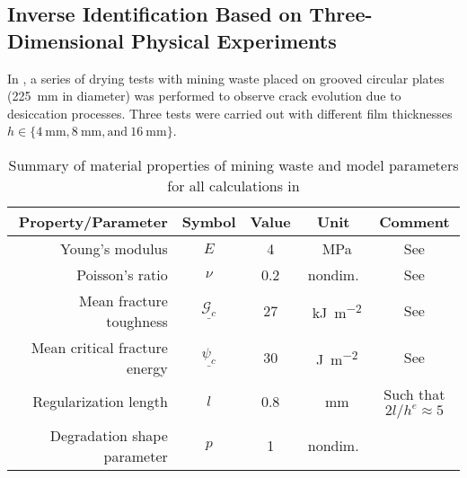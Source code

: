 \subsection{Inverse Identification Based on Three-Dimensional Physical Experiments}

In \citet{Rodriguez2006}, a series of drying tests with mining waste placed on grooved circular plates (\SI{225}{\milli\meter} in diameter) was performed to observe crack evolution due to desiccation processes. Three tests were carried out with different film thicknesses $h \in \{ \SI{4}{\milli\meter}, \SI{8}{\milli\meter}, \text{and}~\SI{16}{\milli\meter} \}$.

\begin{table}[htb!]
  \centering
  \caption{Summary of material properties of mining waste and model parameters for all calculations in }
  \begin{tabular}{r c c c c}
    \toprule
    Property/Parameter            & Symbol                      & Value & Unit                                & Comment                                                     \\
    \midrule
    Young's modulus               & $E$                         & 4     & \SI{}{\mega\pascal}                 & See \cite{sanchez2014modeling}                              \\
    Poisson's ratio               & $\nu$                       & 0.2   & nondim.                             & See \cite{sanchez2014modeling}                              \\
    Mean fracture toughness       & $\underline{\mathcal{G}_c}$ & 27    & \SI{}{\kilo\joule\per\square\meter} & See \cite{rodriguez2007experimental,lakshmikantha2009image} \\[5pt]
    Mean critical fracture energy & $\underline{\psi_c}$        & 30    & \SI{}{\joule\per\square\meter}      & See \cite{rodriguez2007experimental,lakshmikantha2009image} \\[5pt]
    Regularization length         & $l$                         & 0.8   & \SI{}{\milli\meter}                 & Such that $2l/h^e \approx 5$                                \\
    Degradation shape parameter   & $p$                         & 1     & nondim.                             &                                                             \\
    \bottomrule
  \end{tabular}
  \label{tab: MW}
\end{table}

